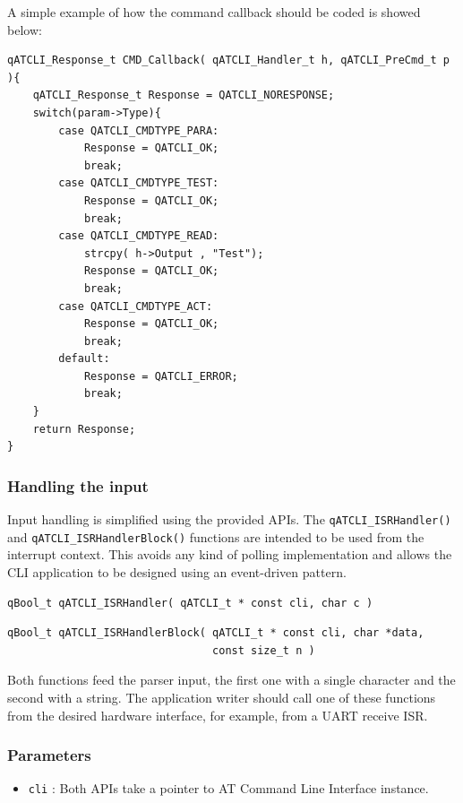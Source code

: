 \documentclass{article}
\begin{document}
A simple example of how the command callback should be coded is showed below: \\

\begin{lstlisting}[style=CStyle]
qATCLI_Response_t CMD_Callback( qATCLI_Handler_t h, qATCLI_PreCmd_t p ){
	qATCLI_Response_t Response = QATCLI_NORESPONSE;
	switch(param->Type){
		case QATCLI_CMDTYPE_PARA:
			Response = QATCLI_OK;
			break;
		case QATCLI_CMDTYPE_TEST:
			Response = QATCLI_OK;
			break;
		case QATCLI_CMDTYPE_READ:
		    strcpy( h->Output , "Test");
			Response = QATCLI_OK;
			break;
		case QATCLI_CMDTYPE_ACT:
			Response = QATCLI_OK;
			break;			
		default:
			Response = QATCLI_ERROR;
			break;
	}
	return Response;
}
\end{lstlisting}


\subsubsection{Handling the input}
Input handling is simplified using the provided APIs. The \lstinline{qATCLI_ISRHandler()}  and \lstinline{qATCLI_ISRHandlerBlock()}   functions are intended to be used from the interrupt context. This avoids any kind of polling implementation and allows the CLI application to be designed using an event-driven pattern.

\begin{lstlisting}[style=CStyle]
qBool_t qATCLI_ISRHandler( qATCLI_t * const cli, char c )
\end{lstlisting}

\begin{lstlisting}[style=CStyle]
qBool_t qATCLI_ISRHandlerBlock( qATCLI_t * const cli, char *data, 
                                const size_t n )
\end{lstlisting}

Both functions feed the parser input, the first one with a single character and the second with a string. The application writer should call one of these functions from the desired hardware interface, for example, from a UART receive ISR. 

\subsubsection*{Parameters}
\begin{itemize}
    \item \lstinline{cli} : Both APIs take a pointer to AT Command Line Interface instance.
\end{itemize}
\end{document}
